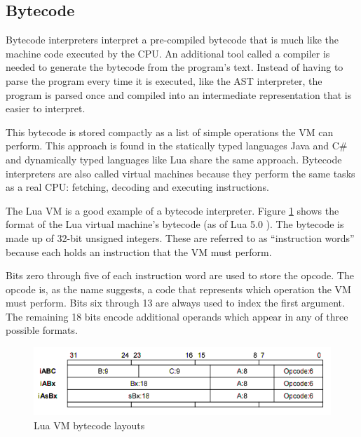 \documentclass[english,a4paper,12pt]{report}
\begin{document}
\subsection{Bytecode}
Bytecode interpreters interpret a pre-compiled bytecode that is much
like the machine code executed by the CPU. An additional tool called a
compiler is needed to generate the bytecode from the program's
text. Instead of having to parse the program every time it is
executed, like the AST interpreter, the program is parsed once and
compiled into an intermediate representation that is easier to
interpret. 

This bytecode is stored compactly as a list of simple operations the
VM can perform. This approach is found in the statically typed
languages Java and C\# and dynamically typed languages like Lua share
the same approach. Bytecode interpreters are also called virtual
machines because they perform the same tasks as a real CPU: fetching,
decoding and executing instructions.

The Lua VM is a good example of a bytecode
interpreter. Figure \ref{fig:luabyte} shows the format of the Lua
virtual machine's bytecode (as of Lua 5.0
\cite{RobertoIerusalimschy}). The bytecode is made up of 32-bit
unsigned integers. These are referred to as ``instruction words''
because each holds an instruction that the VM must perform. 

Bits zero through five of each instruction word are used to store the
opcode. The opcode is, as the name suggests, a code that represents
which operation the VM must perform. Bits six through 13 are always used
to index the first argument. The remaining 18 bits encode additional
operands which appear in any of three possible formats.

\begin{figure}
	\begin{center}
	    \includegraphics[scale=0.5]{luabytecode.png}
	\end{center}
 
  \caption[Lua VM bytecode layouts]{Lua VM bytecode layouts
    \protect\cite{RobertoIerusalimschy}}
  \label{fig:luabyte}
\end{figure}
\end{document}
